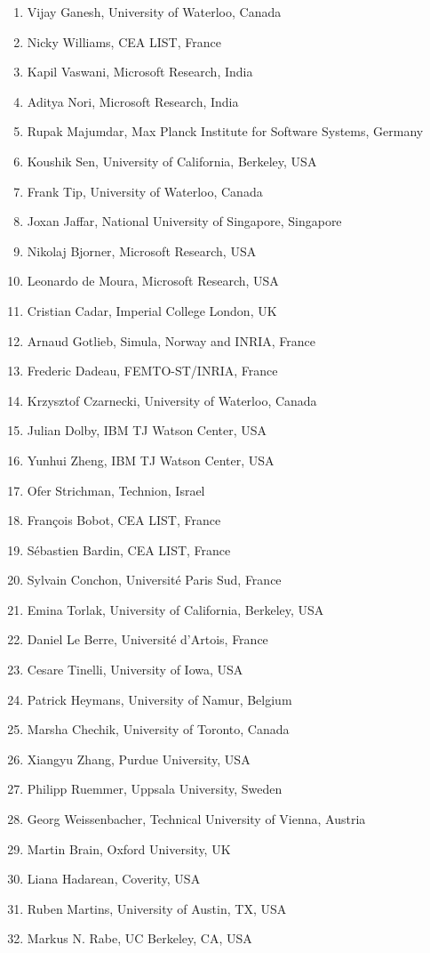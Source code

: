 \documentclass{sig-alternate}
\begin{document}
\begin{enumerate}
\item Vijay Ganesh, University of Waterloo, Canada
\item Nicky Williams, CEA LIST, France
\item Kapil Vaswani, Microsoft Research, India
\item Aditya Nori, Microsoft Research, India
\item Rupak Majumdar, Max Planck Institute for Software Systems, Germany
\item Koushik Sen, University of California, Berkeley, USA
\item Frank Tip, University of Waterloo, Canada
\item Joxan Jaffar, National University of Singapore, Singapore
\item Nikolaj Bjorner, Microsoft Research, USA
\item Leonardo de Moura, Microsoft Research, USA
\item Cristian Cadar, Imperial College London, UK
\item Arnaud Gotlieb, Simula, Norway and INRIA, France
\item Frederic Dadeau, FEMTO-ST/INRIA, France
\item Krzysztof Czarnecki, University of Waterloo, Canada
\item Julian Dolby, IBM TJ Watson Center, USA
\item Yunhui Zheng, IBM TJ Watson Center, USA
\item Ofer Strichman, Technion, Israel
\item Fran{\c c}ois Bobot, CEA LIST, France
\item S{\'e}bastien Bardin, CEA LIST, France
\item Sylvain Conchon, Universit{\'e} Paris Sud, France
\item Emina Torlak, University of California, Berkeley, USA
\item Daniel Le Berre, Universit{\'e} d'Artois, France
\item Cesare Tinelli, University of Iowa, USA
\item Patrick Heymans, University of Namur, Belgium
\item Marsha Chechik, University of Toronto, Canada
\item Xiangyu Zhang, Purdue University, USA
\item Philipp Ruemmer, Uppsala University, Sweden
\item Georg Weissenbacher, Technical University of Vienna, Austria
\item Martin Brain, Oxford University, UK
\item Liana Hadarean, Coverity, USA
\item Ruben Martins, University of Austin, TX, USA
\item Markus N. Rabe, UC Berkeley, CA, USA
\end{enumerate}
\end{document}
